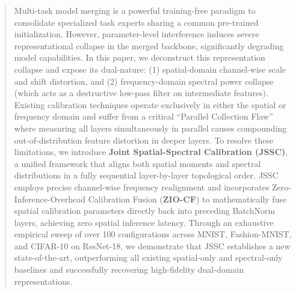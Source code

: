 \documentclass{article}
\begin{document}

\printAffiliationsAndNotice{\icmlEqualContribution}

\begin{abstract}
Multi-task model merging is a powerful training-free paradigm to consolidate specialized task experts sharing a common pre-trained initialization. However, parameter-level interference induces severe representational collapse in the merged backbone, significantly degrading model capabilities. In this paper, we deconstruct this representation collapse and expose its dual-nature: (1) spatial-domain channel-wise scale and shift distortion, and (2) frequency-domain spectral power collapse (which acts as a destructive low-pass filter on intermediate features). Existing calibration techniques operate exclusively in either the spatial or frequency domain and suffer from a critical ``Parallel Collection Flaw'' where measuring all layers simultaneously in parallel causes compounding out-of-distribution feature distortion in deeper layers. To resolve these limitations, we introduce \textbf{Joint Spatial-Spectral Calibration (JSSC)}, a unified framework that aligns both spatial moments and spectral distributions in a fully sequential layer-by-layer topological order. JSSC employs precise channel-wise frequency realignment and incorporates Zero-Inference-Overhead Calibration Fusion (\textbf{ZIO-CF}) to mathematically fuse spatial calibration parameters directly back into preceding BatchNorm layers, achieving zero spatial inference latency. Through an exhaustive empirical sweep of over 100 configurations across MNIST, Fashion-MNIST, and CIFAR-10 on ResNet-18, we demonstrate that JSSC establishes a new state-of-the-art, outperforming all existing spatial-only and spectral-only baselines and successfully recovering high-fidelity dual-domain representations.
\end{abstract}
\end{document}
